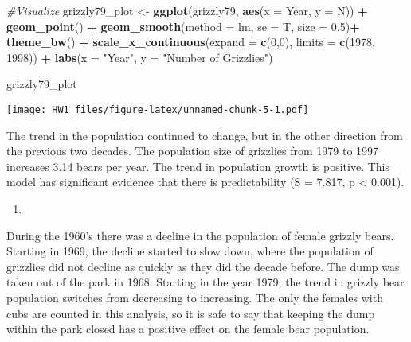 \documentclass[]{article}
\newenvironment{Shaded}{\begin{snugshade}}{\end{snugshade}}
\newcommand{\KeywordTok}[1]{\textcolor[rgb]{0.13,0.29,0.53}{\textbf{#1}}}
\newcommand{\DataTypeTok}[1]{\textcolor[rgb]{0.13,0.29,0.53}{#1}}
\newcommand{\DecValTok}[1]{\textcolor[rgb]{0.00,0.00,0.81}{#1}}
\newcommand{\FloatTok}[1]{\textcolor[rgb]{0.00,0.00,0.81}{#1}}
\newcommand{\StringTok}[1]{\textcolor[rgb]{0.31,0.60,0.02}{#1}}
\newcommand{\CommentTok}[1]{\textcolor[rgb]{0.56,0.35,0.01}{\textit{#1}}}
\newcommand{\OperatorTok}[1]{\textcolor[rgb]{0.81,0.36,0.00}{\textbf{#1}}}
\newcommand{\NormalTok}[1]{#1}
\begin{document}
\begin{Shaded}
\begin{Highlighting}[]
\CommentTok{#Visualize }
\NormalTok{grizzly79_plot <-}\StringTok{ }\KeywordTok{ggplot}\NormalTok{(grizzly79, }\KeywordTok{aes}\NormalTok{(}\DataTypeTok{x =}\NormalTok{ Year, }\DataTypeTok{y =}\NormalTok{ N)) }\OperatorTok{+}
\StringTok{  }\KeywordTok{geom_point}\NormalTok{() }\OperatorTok{+}
\StringTok{  }\KeywordTok{geom_smooth}\NormalTok{(}\DataTypeTok{method =}\NormalTok{ lm, }\DataTypeTok{se =}\NormalTok{ T, }\DataTypeTok{size =} \FloatTok{0.5}\NormalTok{)}\OperatorTok{+}
\StringTok{  }\KeywordTok{theme_bw}\NormalTok{() }\OperatorTok{+}
\StringTok{  }\KeywordTok{scale_x_continuous}\NormalTok{(}\DataTypeTok{expand =} \KeywordTok{c}\NormalTok{(}\DecValTok{0}\NormalTok{,}\DecValTok{0}\NormalTok{), }\DataTypeTok{limits =} \KeywordTok{c}\NormalTok{(}\DecValTok{1978}\NormalTok{, }\DecValTok{1998}\NormalTok{)) }\OperatorTok{+}
\StringTok{  }\KeywordTok{labs}\NormalTok{(}\DataTypeTok{x =} \StringTok{"Year"}\NormalTok{, }\DataTypeTok{y =} \StringTok{"Number of Grizzlies"}\NormalTok{)}


\NormalTok{grizzly79_plot}
\end{Highlighting}
\end{Shaded}

\texttt{[image: HW1\_files/figure-latex/unnamed-chunk-5-1.pdf]}

The trend in the population continued to change, but in the other
direction from the previous two decades. The population size of
grizzlies from 1979 to 1997 increases 3.14 bears per year. The trend in
population growth is positive. This model has significant evidence that
there is predictability (S = 7.817, p \textless{} 0.001).

\begin{enumerate}
\def\labelenumi{\arabic{enumi}.}
\setcounter{enumi}{8}
\item
\end{enumerate}

During the 1960's there was a decline in the population of female
grizzly bears. Starting in 1969, the decline started to slow down, where
the population of grizzlies did not decline as quickly as they did the
decade before. The dump was taken out of the park in 1968. Starting in
the year 1979, the trend in grizzly bear population switches from
decreasing to increasing. The only the females with cubs are counted in
this analysis, so it is safe to say that keeping the dump within the
park closed has a positive effect on the female bear population.
\end{document}
